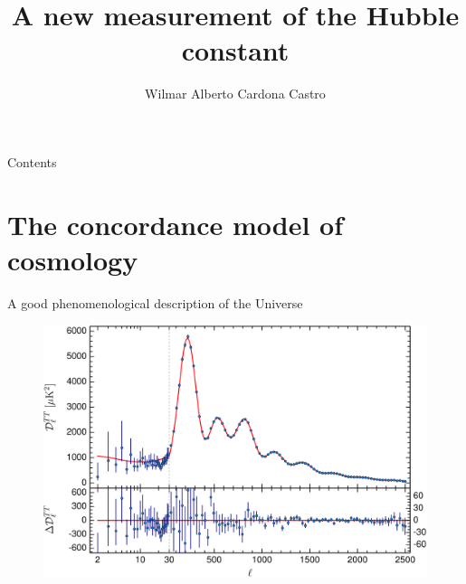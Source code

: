 \documentclass{beamer}
\author[Wilmar Alberto Cardona Castro]{Wilmar Alberto Cardona Castro}
\title[A new measurement of the Hubble constant]{A new measurement of the Hubble constant}
\begin{document}
\begin{frame}
  \titlepage
\end{frame}

\begin{frame}{Contents}
  \tableofcontents
\end{frame}

\section{The concordance model of cosmology}

\begin{frame}{A good phenomenological description of the Universe}
\begin{figure}[hbtp]
\centering
\includegraphics[width=\textwidth]{../figures/2015_TTSpectrum.png}
\end{figure}
\end{frame}
\end{document}
